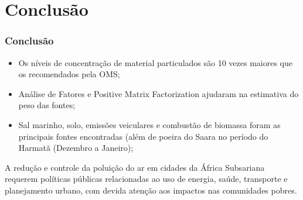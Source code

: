 \section{Conclusão}

\begin{frame}
  \frametitle{Conclusão}
  \begin{itemize}
    \item Os níveis de concentração de material particulados são 10 vezes maiores que os recomendados pela OMS;
    \item Análise de Fatores e Positive Matrix Factorization ajudaram na estimativa do peso das fontes;
    \item Sal marinho, solo, emissões veiculares e combustão de biomassa foram as principais fontes encontradas (além de poeira do Saara no período do Harmatã (Dezembro a Janeiro);
  \end{itemize}
  A redução e controle da poluição do ar em cidades da África Subsariana requerem políticas públicas relacionadas ao uso de energia, 
  saúde, transporte e planejamento urbano, com devida atenção aos impactos nas comunidades pobres.
\end{frame}
